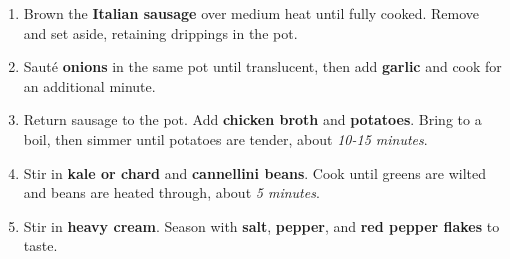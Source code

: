 \documentclass[11pt,letterpaper]{article}
\begin{document}
\begin{enumerate}
    \item Brown the \textbf{Italian sausage} over medium heat until fully cooked. Remove and set aside, retaining drippings in the pot.
    \item Sauté \textbf{onions} in the same pot until translucent, then add \textbf{garlic} and cook for an additional minute.
    \item Return sausage to the pot. Add \textbf{chicken broth} and \textbf{potatoes}. Bring to a boil, then simmer until potatoes are tender, about \textit{10-15 minutes}.
    \item Stir in \textbf{kale or chard} and \textbf{cannellini beans}. Cook until greens are wilted and beans are heated through, about \textit{5 minutes}.
    \item Stir in \textbf{heavy cream}. Season with \textbf{salt}, \textbf{pepper}, and \textbf{red pepper flakes} to taste.
\end{enumerate}
\end{document}
